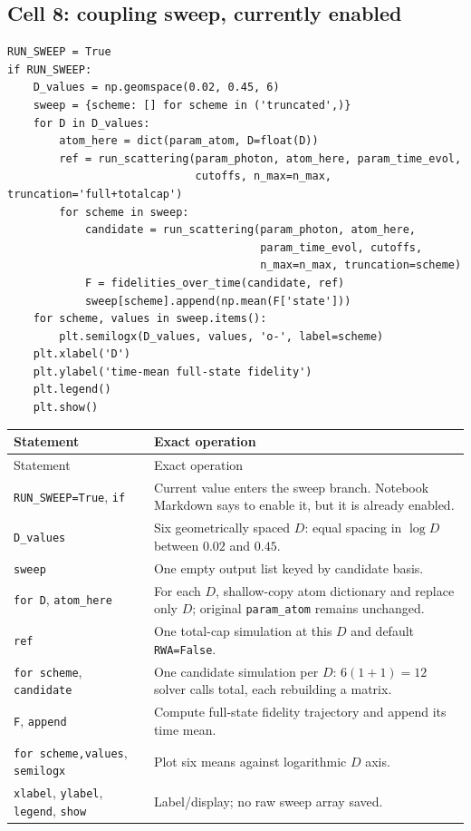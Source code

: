 \documentclass[11pt,a4paper]{article}
\newcommand{\code}[1]{\nolinkurl{#1}}
\begin{document}
\subsection{Cell 8: coupling sweep, currently enabled}
\begin{lstlisting}
RUN_SWEEP = True
if RUN_SWEEP:
    D_values = np.geomspace(0.02, 0.45, 6)
    sweep = {scheme: [] for scheme in ('truncated',)}
    for D in D_values:
        atom_here = dict(param_atom, D=float(D))
        ref = run_scattering(param_photon, atom_here, param_time_evol,
                             cutoffs, n_max=n_max, truncation='full+totalcap')
        for scheme in sweep:
            candidate = run_scattering(param_photon, atom_here,
                                       param_time_evol, cutoffs,
                                       n_max=n_max, truncation=scheme)
            F = fidelities_over_time(candidate, ref)
            sweep[scheme].append(np.mean(F['state']))
    for scheme, values in sweep.items():
        plt.semilogx(D_values, values, 'o-', label=scheme)
    plt.xlabel('D')
    plt.ylabel('time-mean full-state fidelity')
    plt.legend()
    plt.show()
\end{lstlisting}
\begin{longtable}{p{}p{}}
\toprule Statement & Exact operation\\\midrule\endfirsthead
\toprule Statement & Exact operation\\\midrule\endhead
\code{RUN_SWEEP=True}, \code{if} & Current value enters the sweep branch. Notebook Markdown says to enable it, but it is already enabled.\\
\code{D_values} & Six geometrically spaced $D$: equal spacing in $\log D$ between $0.02$ and $0.45$.\\
\code{sweep} & One empty output list keyed by candidate basis.\\
\code{for D}, \code{atom_here} & For each $D$, shallow-copy atom dictionary and replace only $D$; original \code{param_atom} remains unchanged.\\
\code{ref} & One total-cap simulation at this $D$ and default \code{RWA=False}.\\
\code{for scheme}, \code{candidate} & One candidate simulation per $D$: $6(1+1)=12$ solver calls total, each rebuilding a matrix.\\
\code{F}, \code{append} & Compute full-state fidelity trajectory and append its time mean.\\
\code{for scheme,values}, \code{semilogx} & Plot six means against logarithmic $D$ axis.\\
\code{xlabel}, \code{ylabel}, \code{legend}, \code{show} & Label/display; no raw sweep array saved.\\
\bottomrule
\end{longtable}
\end{document}
